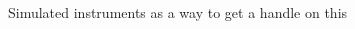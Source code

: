 \documentclass[notes,11pt, aspectratio=169]{beamer}
\begin{document}
\begin{frame}{Simulated instruments as a  way to get a handle on this}
\begin{columns}[T]
\begin{column}{.5\textwidth}
{{{    }}}
\end{column}%
\end{columns}
\end{frame}
\end{document}
